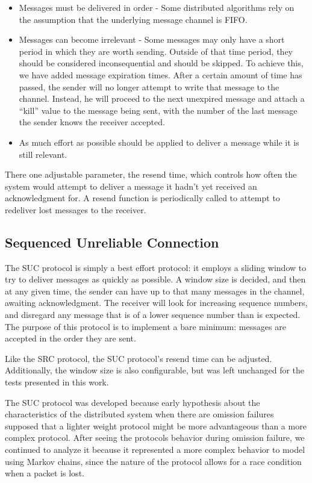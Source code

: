 \begin{itemize}
\item Messages must be delivered in order - Some distributed algorithms rely on
the assumption that the underlying message channel is FIFO.
\item Messages can become irrelevant - Some messages may only have a short
period in which they are worth sending. Outside of that time period, they
should be considered inconsequential and should be skipped. To achieve this, we
have added message expiration times. After a certain amount of time has passed,
the sender will no longer attempt to write that message to the channel.
Instead, he will proceed to the next unexpired message and attach a ``kill''
value to the message being sent, with the number of the last message the sender
knows the receiver accepted.
\item As much effort as possible should be applied to deliver a message while
it is still relevant.
\end{itemize}

There one adjustable parameter, the resend time, which controls how often the
system would attempt to deliver a message it hadn't yet received an
acknowledgment for. A resend function is periodically called to attempt to redeliver
lost messages to the receiver.

\subsection{Sequenced Unreliable Connection}
The SUC protocol is simply a best effort protocol: it employs a sliding window 
to try to deliver messages as quickly as possible. A window size is decided, 
and then at any given time, the sender can have up to that many messages in the 
channel, awaiting acknowledgment. The receiver will look for increasing 
sequence numbers, and disregard any message that is of a lower sequence number 
than is expected. The purpose of this protocol is to implement a bare minimum: 
messages are accepted in the order they are sent.

Like the SRC protocol, the SUC protocol's resend time can be adjusted. 
Additionally, the window size is also configurable, but was left unchanged for 
the tests presented in this work.

The SUC protocol was developed because early hypothesis about the
characteristics of the distributed system when there are omission failures
supposed that a lighter weight protocol might be more advantageous than a more
complex protocol. After seeing the protocols behavior during omission failure,
we continued to analyze it because it represented a more complex behavior to
model using Markov chains, since the nature of the protocol allows for a race
condition when a packet is lost.

